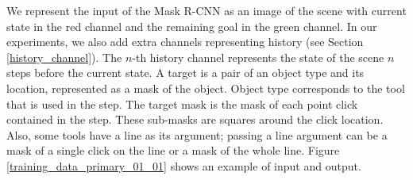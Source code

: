We represent the input of the Mask {R-CNN} as an image of the scene with current state in the red channel and the remaining goal in the green channel. In our experiments, we also add extra channels representing history (see Section \ref{history_channel}). The $n$-th history channel represents the state of the scene $n$ steps before the current state.
\newline \newline
A target is a pair of an object type and its location, represented as a mask of the object. Object type corresponds to the tool that is used in the step. The target mask is the mask of each point click contained in the step.
These sub-masks are squares around the click location. Also, some tools have a line as its argument; passing a line argument can be a mask of a single click on the line or a mask of the whole line. Figure \ref{training_data_primary_01_01} shows an example of input and output.

